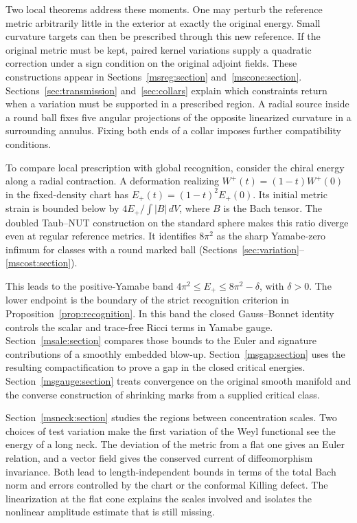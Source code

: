 \documentclass[11pt]{article}
\numberwithin{equation}{section}
\theoremstyle{definition}
\theoremstyle{remark}
\begin{document}
Two local theorems address these moments. One may perturb the
reference metric arbitrarily little in the exterior at exactly the
original energy. Small curvature targets can then be prescribed
through this new reference. If the original metric must be kept,
paired kernel variations supply a quadratic correction under a sign
condition on the original adjoint fields. These constructions appear
in Sections~\ref{msreg:section} and~\ref{mscone:section}.
Sections~\ref{sec:transmission} and~\ref{sec:collars} explain which
constraints return when a variation must be supported in a prescribed
region. A radial source inside a round ball fixes five angular
projections of the opposite linearized curvature in a surrounding
annulus. Fixing both ends of a collar imposes further compatibility
conditions.

To compare local prescription with global recognition, consider the
chiral energy along a radial contraction. A deformation realizing
\(W^+(t)=(1-t)W^+(0)\) in the fixed-density chart has
\(E_+(t)=(1-t)^2E_+(0)\). Its initial metric strain is bounded below
by \(4E_+/\int |B|\,dV\), where \(B\) is the Bach tensor. The doubled
Taub--NUT construction on the standard sphere makes this ratio
diverge even at regular reference metrics. It identifies \(8\pi^2\)
as the sharp Yamabe-zero infimum for classes with a round marked ball
(Sections~\ref{sec:variation}--\ref{mscost:section}).

This leads to the positive-Yamabe band
\(4\pi^2\le E_+\le8\pi^2-\delta\), with \(\delta>0\).
The lower endpoint is the boundary of the strict recognition criterion
in Proposition~\ref{prop:recognition}. In this band the closed
Gauss--Bonnet identity controls the scalar and trace-free Ricci terms
in Yamabe gauge. Section~\ref{msale:section} compares those bounds to
the Euler and signature contributions of a smoothly embedded blow-up.
Section~\ref{msgap:section} uses the resulting compactification to prove
a gap in the closed critical energies. Section~\ref{msgauge:section}
treats convergence on the original smooth manifold and the converse
construction of shrinking marks from a supplied critical class.

Section~\ref{msneck:section} studies the regions between concentration
scales. Two choices of test variation make the first variation of the
Weyl functional see the energy of a long neck. The deviation of the
metric from a flat one gives an Euler relation, and a vector field
gives the conserved current of diffeomorphism invariance. Both lead to
length-independent bounds in terms of the total Bach norm and errors
controlled by the chart or the conformal Killing defect.
The linearization at the flat cone explains the scales involved and
isolates the nonlinear amplitude estimate that is still missing.
\end{document}
